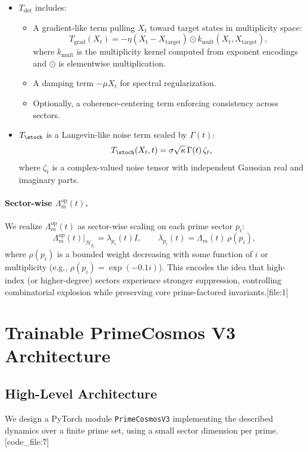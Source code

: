 \documentclass[11pt]{article}
\begin{document}
\begin{itemize}[leftmargin=1.5em]
\item $T_{\det}$ includes:
\begin{itemize}[leftmargin=1em]
\item A gradient-like term pulling $X_t$ toward target states in multiplicity space:
\[
T_{\mathrm{grad}}(X_t) = -\eta (X_t - X_{\mathrm{target}})\odot k_{\mathrm{mult}}(X_t,X_{\mathrm{target}}),
\]
where $k_{\mathrm{mult}}$ is the multiplicity kernel computed from exponent encodings and $\odot$ is elementwise multiplication.
\item A damping term $-\mu X_t$ for spectral regularization.
\item Optionally, a coherence-centering term enforcing consistency across sectors.
\end{itemize}
\item $T_{\stoch}$ is a Langevin-like noise term scaled by $\Gamma(t)$:
\[
T_{\stoch}(X_t,t) = \sigma\sqrt{\kappa}\,\Gamma(t)\, \zeta_t,
\]
where $\zeta_t$ is a complex-valued noise tensor with independent Gaussian real and imaginary parts.
\end{itemize}

\paragraph{Sector-wise $\Lambda_m^{\mathrm{op}}(t)$.}

We realize $\Lambda_m^{\mathrm{op}}(t)$ as sector-wise scaling on each prime sector $p_i$:
\[
\Lambda_m^{\mathrm{op}}(t)\big|_{\mathcal{H}_{p_i}} = \lambda_{p_i}(t) I,\qquad 
\lambda_{p_i}(t) = \Lambda_m(t)\,\rho(p_i),
\]
where $\rho(p_i)$ is a bounded weight decreasing with some function of $i$ or multiplicity (e.g., $\rho(p_i)=\exp(-0.1 i)$). This encodes the idea that high-index (or higher-degree) sectors experience stronger suppression, controlling combinatorial explosion while preserving core prime-factored invariants.[file:1]

\section{Trainable PrimeCosmos V3 Architecture}

\subsection{High-Level Architecture}

We design a PyTorch module \texttt{PrimeCosmosV3} implementing the described dynamics over a finite prime set, using a small sector dimension per prime.[code_file:7]
\end{document}
